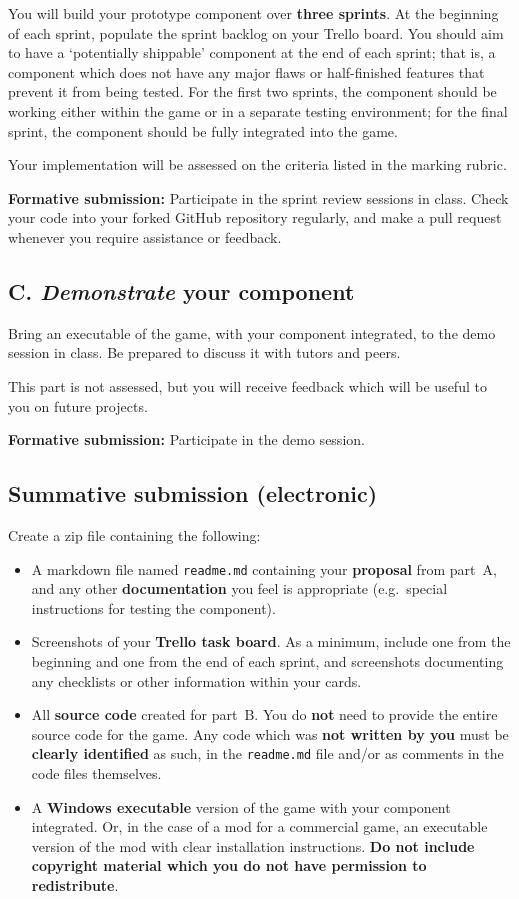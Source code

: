 \documentclass{../fal_assignment}
\begin{document}
You will build your prototype component over \textbf{three sprints}.
At the beginning of each sprint, populate the sprint backlog on your Trello board.
You should aim to have a `potentially shippable' component at the end of each sprint;
that is, a component which does not have any major flaws or half-finished features that prevent it from being tested.
For the first two sprints, the component should be working either within the game or in a separate testing environment;
for the final sprint, the component should be fully integrated into the game.

Your implementation will be assessed on the criteria listed in the marking rubric.

\textbf{Formative submission:} Participate in the sprint review sessions in class.
Check your code into your forked GitHub repository regularly,
and make a pull request whenever you require assistance or feedback.

\subsection*{C. \emph{Demonstrate} your component}

Bring an executable of the game, with your component integrated, to the demo session in class.
Be prepared to discuss it with tutors and peers.

This part is not assessed, but you will receive feedback which will be useful to you on future projects.

\textbf{Formative submission:} Participate in the demo session.

\subsection*{Summative submission (electronic)}

Create a zip file containing the following:

\begin{itemize}
\item A markdown file named \texttt{readme.md} containing your \textbf{proposal} from part~A,
    and any other \textbf{documentation} you feel is appropriate
    (e.g.\ special instructions for testing the component).
\item Screenshots of your \textbf{Trello task board}.
    As a minimum, include one from the beginning and one from the end of each sprint,
    and screenshots documenting any checklists or other information within your cards.
\item All \textbf{source code} created for part~B.
    You do \textbf{not} need to provide the entire source code for the game.
    Any code which was \textbf{not written by you} must be \textbf{clearly identified} as such,
    in the \texttt{readme.md} file and/or as comments in the code files themselves.
\item A \textbf{Windows executable} version of the game with your component integrated.
    Or, in the case of a mod for a commercial game, an executable version of the mod with clear installation instructions.
    \textbf{Do not include copyright material which you do not have permission to redistribute}.
\end{itemize}
\end{document}
